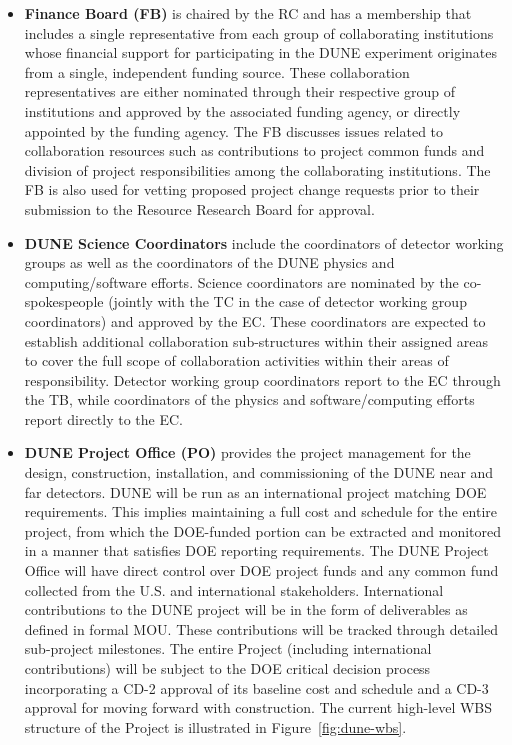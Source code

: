 \begin{itemize}
  \item \textbf{Finance Board (FB)} is chaired by the RC and has a membership that includes a single representative from each group of collaborating institutions whose financial support for participating in the DUNE experiment originates from a single, independent funding source.  These collaboration representatives are either nominated through their respective group of institutions and approved by the associated funding agency, or directly appointed by the funding agency.  The FB discusses issues related to  collaboration resources such as contributions to project common funds and division of project responsibilities among the collaborating institutions.  The FB is also used for vetting proposed project change requests prior to their submission to the Resource Research Board for approval.   
  \item \textbf{DUNE Science Coordinators} include the coordinators of detector working groups as well as the coordinators of the DUNE physics and computing/software efforts.  Science coordinators are nominated by the co-spokespeople (jointly with the TC in the case of detector working group coordinators) and approved by the EC.  These coordinators are expected to establish additional collaboration sub-structures within their assigned areas to cover the full scope of collaboration activities within their areas of responsibility.  Detector working group coordinators report to the EC through the TB, while coordinators of   the physics and software/computing efforts report directly to the EC.   
  \item \textbf{DUNE Project Office (PO)} provides the project management for the design, construction, installation, and commissioning of the DUNE near and far detectors. DUNE will be run as an international project matching DOE requirements. This implies maintaining a full cost and schedule for the entire project, from which the DOE-funded portion can be extracted and monitored in a manner that satisfies DOE reporting requirements. The DUNE Project Office will have direct control over DOE project funds and any common fund collected from the U.S. and international stakeholders. International contributions to the DUNE project will be in the form of deliverables as defined in formal MOU. These contributions will be tracked through detailed sub-project milestones. The entire Project (including international contributions) will be subject to the DOE critical decision process incorporating a CD-2 approval of its baseline cost and schedule and a CD-3 approval for moving forward with construction.  The current high-level WBS structure of the Project is illustrated in Figure~\ref{fig:dune-wbs}.

\end{itemize}
